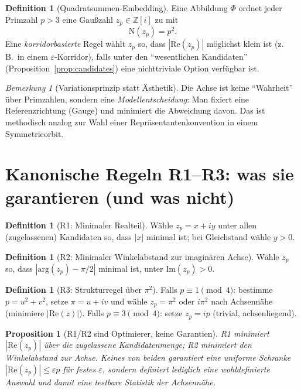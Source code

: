 \documentclass[a4paper,11pt]{article}
\newtheorem{proposition}[satz]{Proposition}
\theoremstyle{definition}
\newtheorem{definition}[satz]{Definition}
\theoremstyle{remark}
\newtheorem{bemerkung}[satz]{Bemerkung}
\newcommand{\Zi}{\mathbb{Z}[i]}
\newcommand{\Norm}{\mathrm{N}}
\newcommand{\Arg}{\mathrm{arg}}
\newcommand{\Ree}{\mathrm{Re}}
\newcommand{\Imm}{\mathrm{Im}}
\newcommand{\abs}[1]{\left|#1\right|}
\begin{document}
	\begin{definition}[Quadratsummen-Embedding]
		Eine Abbildung \(\Phi\) ordnet jeder Primzahl \(p>3\) eine Gaußzahl \(z_p\in\Zi\) zu mit
		\[
		\Norm(z_p)=p^2.
		\]
		Eine \emph{korridorbasierte} Regel wählt \(z_p\) so, dass \(\abs{\Ree(z_p)}\) möglichst klein ist
		(z.\,B.\ in einem \(\varepsilon\)-Korridor), falls unter den ``wesentlichen Kandidaten'' (Proposition~\ref{prop:candidates})
		eine nichttriviale Option verfügbar ist.
	\end{definition}
	
	\begin{bemerkung}[Variationsprinzip statt Ästhetik]
		Die Achse ist keine ``Wahrheit'' über Primzahlen, sondern eine \emph{Modellentscheidung}:
		Man fixiert eine Referenzrichtung (Gauge) und minimiert die Abweichung davon. Das ist methodisch analog zur Wahl einer
		Repräsentantenkonvention in einem Symmetrieorbit.
	\end{bemerkung}
	
	\section{Kanonische Regeln R1--R3: was sie garantieren (und was nicht)}
	\begin{definition}[R1: Minimaler Realteil]
		Wähle \(z_p=x+iy\) unter allen (zugelassenen) Kandidaten so, dass \(\abs{x}\) minimal ist; bei Gleichstand wähle \(y>0\).
	\end{definition}
	
	\begin{definition}[R2: Minimaler Winkelabstand zur imaginären Achse]
		Wähle \(z_p\) so, dass \(\abs{\Arg(z_p)-\pi/2}\) minimal ist, unter \(\Imm(z_p)>0\).
	\end{definition}
	
	\begin{definition}[R3: Strukturregel über \(\pi^2\)]
		Falls \(p\equiv 1\pmod4\): bestimme \(p=u^2+v^2\), setze \(\pi=u+iv\) und wähle \(z_p=\pi^2\) oder \(i\pi^2\) nach
		Achsennähe (minimiere \(\abs{\Ree(z)}\)). Falls \(p\equiv 3\pmod4\): setze \(z_p=ip\) (trivial, achsenliegend).
	\end{definition}
	
	\begin{proposition}[R1/R2 sind Optimierer, keine Garantien]
		R1 minimiert \(\abs{\Ree(z_p)}\) über die zugelassene Kandidatenmenge; R2 minimiert den Winkelabstand zur Achse.
		Keines von beiden garantiert eine uniforme Schranke \(\abs{\Ree(z_p)}\le \varepsilon p\) für festes \(\varepsilon\),
		sondern definiert lediglich eine wohldefinierte Auswahl und damit eine testbare Statistik der Achsennähe.
	\end{proposition}
	
\end{document}
